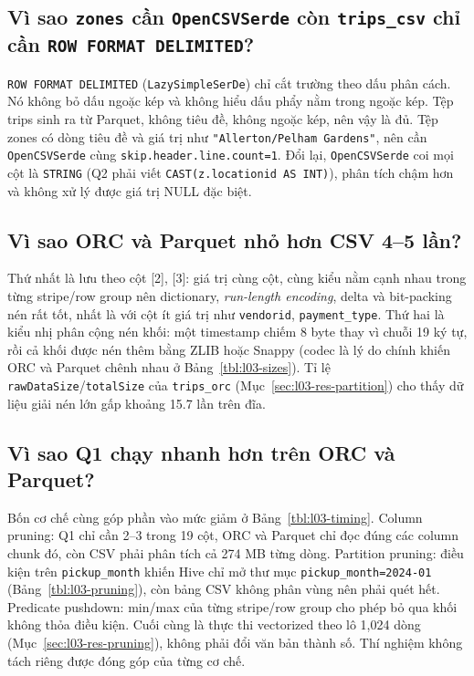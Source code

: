 \documentclass[
  12pt,
  a4paper,
]{article}
\begin{document}
\subsection{\texorpdfstring{Vì sao \texttt{zones} cần
\texttt{OpenCSVSerde} còn \texttt{trips\_csv} chỉ cần
\texttt{ROW\ FORMAT\ DELIMITED}\allowbreak{}?}{Vì sao zones cần OpenCSVSerde còn trips\_csv chỉ cần ROW FORMAT DELIMITED?}}\label{sec:l03-q2}

\texttt{ROW\ FORMAT\ DELIMITED}\allowbreak{} (\texttt{LazySimpleSerDe})
chỉ cắt trường theo dấu phân cách. Nó không bỏ dấu ngoặc kép và không
hiểu dấu phẩy nằm trong ngoặc kép. Tệp trips sinh ra từ Parquet, không
tiêu đề, không ngoặc kép, nên vậy là đủ. Tệp zones có dòng tiêu đề và
giá trị như
\texttt{"Allerton/}\allowbreak{}\texttt{Pelham\ Gardens"}\allowbreak{},
nên cần \texttt{OpenCSVSerde} cùng
\texttt{skip.}\allowbreak{}\texttt{header.}\allowbreak{}\texttt{line.}\allowbreak{}\texttt{count=}\allowbreak{}\texttt{1}\allowbreak{}.
Đổi lại, \texttt{OpenCSVSerde} coi mọi cột là \texttt{STRING} (Q2 phải
viết
\texttt{CAST(z.}\allowbreak{}\texttt{locationid\ AS\ INT)}\allowbreak{}),
phân tích chậm hơn và không xử lý được giá trị NULL đặc biệt.

\subsection{Vì sao ORC và Parquet nhỏ hơn CSV 4--5
lần?}\label{sec:l03-q3}

Thứ nhất là lưu theo cột {[}2{]}, {[}3{]}: giá trị cùng cột, cùng kiểu
nằm cạnh nhau trong từng stripe/row group nên dictionary,
\emph{run-length encoding}, delta và bit-packing nén rất tốt, nhất là
với cột ít giá trị như \texttt{vendorid}, \texttt{payment\_type}. Thứ
hai là kiểu nhị phân cộng nén khối: một timestamp chiếm 8 byte thay vì
chuỗi 19 ký tự, rồi cả khối được nén thêm bằng ZLIB hoặc Snappy (codec
là lý do chính khiến ORC và Parquet chênh nhau ở
Bảng~\ref{tbl:l03-sizes}). Tỉ lệ \texttt{rawDataSize}/\texttt{totalSize}
của \texttt{trips\_orc} (Mục~\ref{sec:l03-res-partition}) cho thấy dữ
liệu giải nén lớn gấp khoảng 15.7 lần trên đĩa.

\subsection{Vì sao Q1 chạy nhanh hơn trên ORC và
Parquet?}\label{sec:l03-q4}

Bốn cơ chế cùng góp phần vào mức giảm ở Bảng~\ref{tbl:l03-timing}.
Column pruning: Q1 chỉ cần 2--3 trong 19 cột, ORC và Parquet chỉ đọc
đúng các column chunk đó, còn CSV phải phân tích cả 274 MB từng dòng.
Partition pruning: điều kiện trên \texttt{pickup\_month} khiến Hive chỉ
mở thư mục
\texttt{pickup\_}\allowbreak{}\texttt{month=}\allowbreak{}\texttt{2024-01}\allowbreak{}
(Bảng~\ref{tbl:l03-pruning}), còn bảng CSV không phân vùng nên phải quét
hết. Predicate pushdown: min/max của từng stripe/row group cho phép bỏ
qua khối không thỏa điều kiện. Cuối cùng là thực thi vectorized theo lô
1,024 dòng (Mục~\ref{sec:l03-res-pruning}), không phải đổi văn bản thành
số. Thí nghiệm không tách riêng được đóng góp của từng cơ chế.
\end{document}
